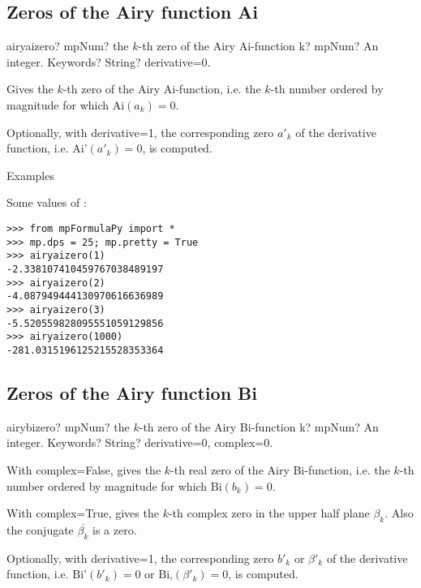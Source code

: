 \subsection{Zeros of the Airy function Ai}

\begin{mpFunctionsExtract}
	\mpFunctionTwo
	{airyaizero? mpNum? the $k$-th zero of the Airy Ai-function}
	{k? mpNum? An integer.}
	{Keywords? String? derivative=0.}	
\end{mpFunctionsExtract}

\vpara
Gives the $k$-th zero of the Airy Ai-function, i.e. the $k$-th number ordered by magnitude for which $\text{Ai}(a_k)=0$.

Optionally, with derivative=1, the corresponding zero $a'_k$ of the derivative function, i.e. $\text{Ai'}(a'_k)=0$, is computed.

Examples

Some values of :

\begin{lstlisting}
>>> from mpFormulaPy import *
>>> mp.dps = 25; mp.pretty = True
>>> airyaizero(1)
-2.338107410459767038489197
>>> airyaizero(2)
-4.087949444130970616636989
>>> airyaizero(3)
-5.520559828095551059129856
>>> airyaizero(1000)
-281.0315196125215528353364
\end{lstlisting}



\subsection{Zeros of the Airy function Bi}

\begin{mpFunctionsExtract}
	\mpFunctionTwo
	{airybizero? mpNum? the $k$-th zero of the Airy Bi-function}
	{k? mpNum? An integer.}
	{Keywords? String? derivative=0, complex=0.}	
\end{mpFunctionsExtract}


\vpara
With complex=False, gives the $k$-th real zero of the Airy Bi-function, i.e. the $k$-th number ordered by magnitude for which $\text{Bi}(b_k)=0$.

With complex=True, gives the $k$-th complex zero in the upper half plane $\beta_k$. Also the conjugate $\overline{\beta_k}$ is a zero.

Optionally, with derivative=1, the corresponding zero $b'_k$ or $\beta'_k$ of the derivative function, i.e. $\text{Bi'}(b'_k)=0$ or $\text{Bi,}(\beta'_k)=0$, is computed.

